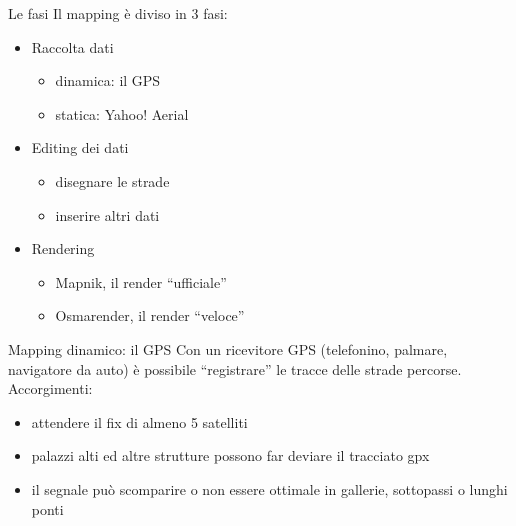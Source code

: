 \documentclass[slidestop,compress,red,notes,xcolor=dvipsnames]{beamer}	%
\begin{document}
        \begin{frame}{Le fasi}
            Il mapping è diviso in 3 fasi:
            \pause
            \begin{itemize}
                \item Raccolta dati
                \begin{itemize}
                    \item dinamica: il GPS
                    \item statica: Yahoo! Aerial 
                \end{itemize}
                \vspace{0.5cm}
                \pause
                \item Editing dei dati
                \begin{itemize}
                    \item disegnare le strade
                    \item inserire altri dati
                \end{itemize}
                \vspace{0.5cm}
                \pause
                \item Rendering
                \begin{itemize}
                    \item Mapnik, il render ``ufficiale''
                    \item Osmarender, il render ``veloce''
                \end{itemize}
            \end{itemize}
        \end{frame}

        \begin{frame}{Mapping dinamico: il GPS}
            Con un ricevitore GPS (telefonino, palmare, navigatore da auto) è possibile ``registrare'' le tracce delle strade percorse.\pause\\
            Accorgimenti:
            \begin{itemize}
                \item attendere il fix di almeno 5 satelliti
                \pause
                \item palazzi alti ed altre strutture possono far deviare il tracciato gpx
                \pause
                \item il segnale può scomparire o non essere ottimale in gallerie, sottopassi o lunghi ponti
            \end{itemize}
        \end{frame}
\end{document}
